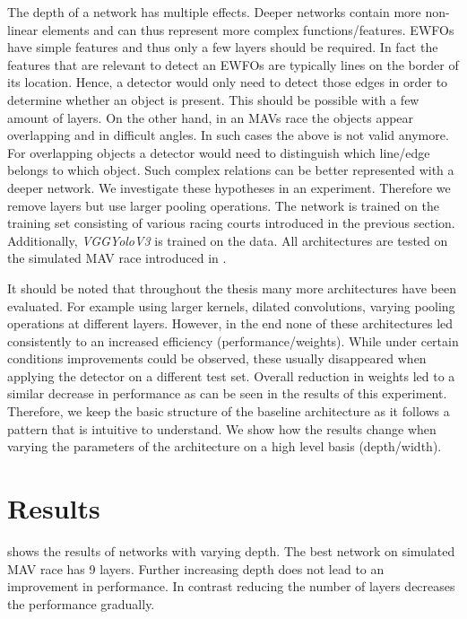 The depth of a network has multiple effects. Deeper networks contain more non-linear elements and can thus represent more complex functions/features. \acp{EWFO} have simple features and thus only a few layers should be required. In fact the features that are relevant to detect an \acp{EWFO} are typically lines on the border of its location. Hence, a detector would only need to detect those edges in order to determine whether an object is present. This should be possible with a few amount of layers. On the other hand, in an \acp{MAV} race the objects appear overlapping and in difficult angles. In such cases the above is not valid anymore. For overlapping objects a detector would need to distinguish which line/edge belongs to which object. Such complex relations can be better represented with a deeper network. We investigate these hypotheses in an experiment. Therefore we remove layers but use larger pooling operations. The network is trained on the training set consisting of various racing courts introduced in the previous section. Additionally, \textit{VGGYoloV3} is trained on the data. All architectures are tested on the simulated \ac{MAV} race introduced in .

It should be noted that throughout the thesis many more architectures have been evaluated. For example using larger kernels, dilated convolutions, varying pooling operations at different layers. However, in the end none of these architectures led consistently to an increased efficiency (performance/weights). While under certain conditions improvements could be observed, these usually disappeared when applying the detector on a different test set. Overall reduction in weights led to a similar decrease in performance as can be seen in the results of this experiment. Therefore, we keep the basic structure of the baseline architecture as it follows a pattern that is intuitive to understand. We show how the results change when varying the parameters of the architecture on a high level basis (depth/width).

\section{Results}

 shows the results of networks with varying depth. The best network on simulated \ac{MAV} race has 9 layers. Further increasing depth does not lead to an improvement in performance. In contrast reducing the number of layers decreases the performance gradually. 


